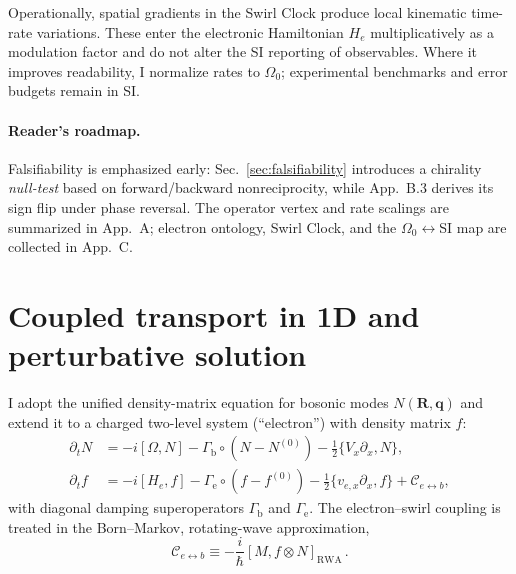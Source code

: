 \documentclass[aps,prb,preprint,amsmath,amssymb]{revtex4-2} %
\begin{document}
        Operationally, spatial gradients in the Swirl Clock produce local kinematic time-rate variations. These enter the electronic Hamiltonian $H_e$ multiplicatively as a modulation factor and do not alter the SI reporting of observables. Where it improves readability, I normalize rates to $\Omega_0$; experimental benchmarks and error budgets remain in SI.

        \paragraph*{Reader’s roadmap.}
            Falsifiability is emphasized early: Sec.~\ref{sec:falsifiability} introduces a chirality \emph{null-test} based on forward/backward nonreciprocity, while App.~B.3 derives its sign flip under phase reversal. The operator vertex and rate scalings are summarized in App.~A; electron ontology, Swirl Clock, and the $\Omega_0\!\leftrightarrow$SI map are collected in App.~C.


    \section{Coupled transport in 1D and perturbative solution}
        I adopt the unified density-matrix equation for bosonic modes $N(\mathbf R,\mathbf q)$ \cite{Simoncelli2022} and extend it to a charged two-level system (``electron'') with density matrix $f$:
        \begin{align}
            \partial_t N &= -i[\Omega,N] - \Gamma_\mathrm{b} \circ (N-N^{(0)}) - \tfrac12\{ V_x \partial_x, N\},\label{eq:Ndyn}\\
            \partial_t f &= -i[H_e,f] - \Gamma_\mathrm{e}\circ(f-f^{(0)}) - \tfrac12\{ v_{e,x}\partial_x, f\} + \mathcal C_{e\leftrightarrow b},\label{eq:fdyn}
        \end{align}
        with diagonal damping superoperators $\Gamma_\mathrm{b}$ and $\Gamma_\mathrm{e}$. The electron--swirl coupling is treated in the Born--Markov, rotating-wave approximation,
        \begin{equation}
            \mathcal C_{e\leftrightarrow b} \equiv -\frac{i}{\hbar}[M, f\otimes N]_{\mathrm{RWA}}\,.
        \end{equation}
\end{document}
